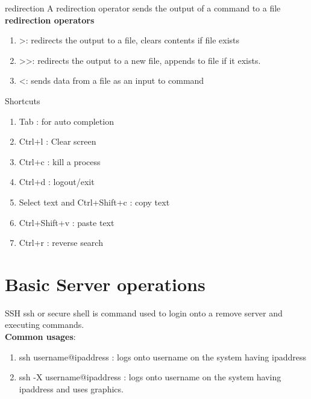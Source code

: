 \documentclass[11pt]{beamer}
\begin{document}
\begin{frame}{redirection}
A redirection operator sends the output of a command to a file\\ \vspace{1cm}
\textbf{\large redirection operators}
\begin{enumerate}
\item \textgreater  : redirects the output to a file, clears contents if file exists
\item \textgreater \textgreater : redirects the output to a new file, appends to file if it exists.
\item \textless : sends data from a file as an input to command
\end{enumerate}
\end{frame}

\begin{frame}{Shortcuts}
\begin{enumerate}
\item Tab : for auto completion
\item Ctrl+l : Clear screen
\item Ctrl+c : kill a process
\item Ctrl+d : logout/exit
\item Select text and Ctrl+Shift+c : copy text
\item Ctrl+Shift+v : paste text
\item Ctrl+r : reverse search
\end{enumerate}
\end{frame}

\section{Basic Server operations}
\begin{frame}{SSH}
ssh or secure shell is command used to login onto a remove server and executing commands.\\ \vspace{1cm}
\textbf{Common usages}:\\
\begin{enumerate}
\item ssh username@ipaddress : logs onto username on the system having ipaddress
\item ssh -X username@ipaddress : logs onto username on the system having ipaddress and uses graphics.
\end{enumerate}
\end{frame}
\end{document}
